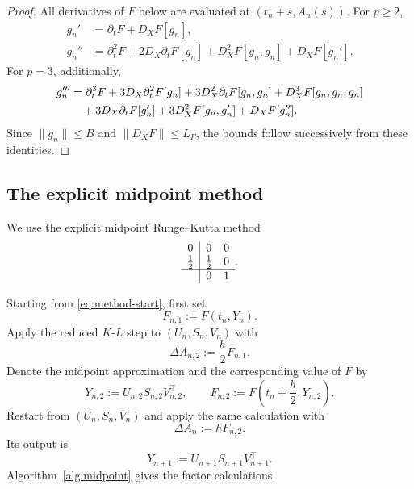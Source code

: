 \documentclass[]{article}
\numberwithin{equation}{section}
\theoremstyle{plain}
\theoremstyle{remark}
\numberwithin{algorithm}{section}
\begin{document}
\begin{proof}
All derivatives of \(F\) below are evaluated at
\((t_n+s,A_n(s))\).  For \(p\ge2\),
\begin{align}
 g_n'&=\partial_tF+D_XF[g_n],                         \label{eq:g-first}\\
 g_n''&=\partial_t^2F+2D_X\partial_tF[g_n]+D_X^2F[g_n,g_n]
          +D_XF[g_n'].                              \label{eq:g-second}
\end{align}
For \(p=3\), additionally,
\begin{align}
 g_n'''&=\partial_t^3F+3D_X\partial_t^2F[g_n]
 +3D_X^2\partial_tF[g_n,g_n]+D_X^3F[g_n,g_n,g_n]\notag\\
 &\quad+3D_X\partial_tF[g_n']+3D_X^2F[g_n,g_n']+D_XF[g_n''].
                                                     \label{eq:g-third}
\end{align}
Since \(\|g_n\|\le B\) and \(\|D_XF\|\le L_F\), the bounds follow
successively from these identities.
\end{proof}

\subsection{The explicit midpoint method}
\label{sec:midpoint}

We use the explicit midpoint Runge--Kutta method
\begin{equation}\label{eq:midpoint-tableau}
\begin{array}{c|cc}
0&0&0\\
\frac12&\frac12&0\\ \hline
&0&1
\end{array}.
\end{equation}

Starting from \eqref{eq:method-start}, first set
\begin{equation}\label{eq:midpoint-stage-one}
 F_{n,1}:=F(t_n,Y_n).
\end{equation}
Apply the reduced \(K\)-\(L\) step to
\((U_n,S_n,V_n)\) with
\begin{equation}\label{eq:midpoint-stage-two-increment}
 \Delta A_{n,2}:=\frac h2F_{n,1}.
\end{equation}
Denote the midpoint approximation and the corresponding value of \(F\) by
\begin{equation}\label{eq:midpoint-stage-two}
 Y_{n,2}:=U_{n,2}S_{n,2}V_{n,2}^\top,
 \qquad F_{n,2}:=F\left(t_n+\frac h2,Y_{n,2}\right).
\end{equation}
Restart from \((U_n,S_n,V_n)\) and apply the same calculation with
\begin{equation}\label{eq:midpoint-final-increment}
 \Delta A_n:=hF_{n,2}.
\end{equation}
Its output is
\begin{equation}\label{eq:midpoint-final-output}
 Y_{n+1}:=U_{n+1}S_{n+1}V_{n+1}^\top.
\end{equation}
Algorithm~\ref{alg:midpoint} gives the factor calculations.
\end{document}
